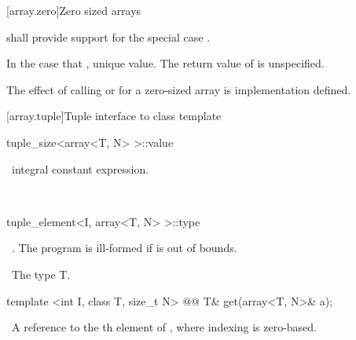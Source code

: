 \documentclass[american,twoside]{book}
\begin{document}
[array.zero]{Zero sized arrays}
%

\pnum{} shall provide support for the special case .

\pnum In the case that ,  unique value.
The return value of  is unspecified.

\pnum
The effect of calling  or  for a zero-sized array
is implementation defined.

[array.tuple]{Tuple interface to class template }
%
%
%
%

%
\begin{itemdecl}
tuple_size<array<T, N> >::value
\end{itemdecl}

\begin{itemdescr}
\pnum
\returntype\   integral constant expression.

\pnum
\cvalue\  
\end{itemdescr}

%
\begin{itemdecl}
tuple_element<I, array<T, N> >::type
\end{itemdecl}

\begin{itemdescr}
\pnum
\requires\  .   The program is ill-formed if  is out of bounds.

\pnum
\cvalue\  The type T.
\end{itemdescr}

%
%
\begin{itemdecl}
template <int I, class T, size_t N> 
  @@
  T& get(array<T, N>& a); 
\end{itemdecl}

\begin{itemdescr}
\pnum
{}

\returns\  A reference to the th element of , 
where indexing is zero-based.
\end{itemdescr}
\end{document}
